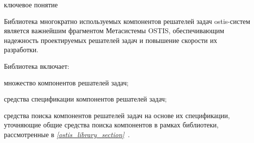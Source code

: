 \begin{SCn}
\bigskip

\begin{scnrelfromlist}{ключевое понятие}
\end{scnrelfromlist}

\end{SCn}



Библиотека многократно используемых компонентов решателей задач ostis-систем является важнейшим фрагментом Метасистемы OSTIS, обеспечивающим надежность проектируемых решателей задач и повышение скорости их разработки.

Библиотека включает:
\begin{textitemize}
\item множество компонентов решателей задач;
\item средства спецификации компонентов решателей задач;
\item средства поиска компонентов решателей задач на основе их спецификации, уточняющие общие средства поиска компонентов в рамках библиотеки, рассмотренные в \textit{\ref{ostis_library_section}~}.
\end{textitemize}

